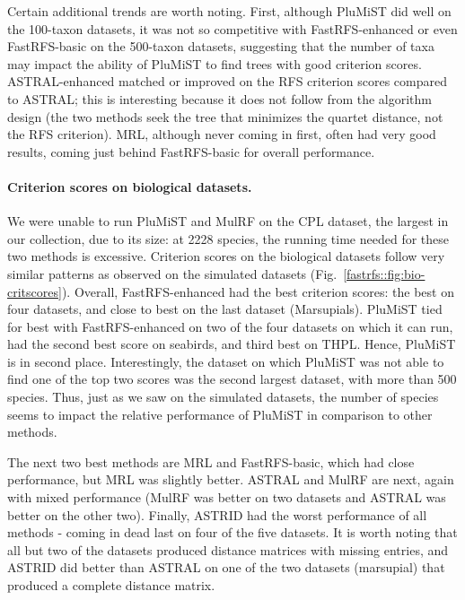 Certain additional trends are worth noting.
First, although PluMiST did well on the 100-taxon
datasets, it was not so competitive with FastRFS-enhanced
or even FastRFS-basic on the 500-taxon datasets, suggesting
that 
the number of taxa may impact the ability of
PluMiST to find trees with good criterion scores.
ASTRAL-enhanced matched or improved on the
RFS criterion scores compared
to ASTRAL; this is interesting because it
does not follow from the algorithm design
(the two methods seek the tree that minimizes
the quartet distance, not the RFS criterion).
MRL, although never coming in first, often
had very good results, coming just behind
FastRFS-basic for overall performance. 








\paragraph{Criterion scores on biological datasets. }

We were unable to 
run PluMiST and MulRF on the CPL dataset, the largest
in our collection, due to its size: at 2228 species,
the running time needed for these two methods is
excessive.
Criterion scores on the biological datasets follow 
very similar patterns as observed on the simulated 
datasets (Fig.~\ref{fastrfs::fig:bio-critscores}). %
Overall, FastRFS-enhanced had the
best criterion scores: the best on
four datasets, and close to best on the last
dataset (Marsupials).
PluMiST tied for best with FastRFS-enhanced
on two  of the four
datasets on which it can run, 
had the second best score on seabirds,
and third best on THPL.
Hence, PluMiST is in second place.
Interestingly, the dataset on which PluMiST was
not able to find one of the top two scores
was the second largest dataset, with more
than 500 species.
Thus, just as we 
saw on the simulated datasets, the number of species seems to impact
the relative performance of PluMiST in comparison
to other methods.

The next two best methods are MRL and FastRFS-basic,
which had close performance, but MRL was
slightly better.
ASTRAL and MulRF are next, again with
mixed performance (MulRF was better
on two datasets and ASTRAL was better on the other
two). Finally, ASTRID had the worst
performance of all methods - coming in 
dead last on four of the five datasets.
It is worth noting that all but two of
the datasets produced distance matrices
with missing entries, and ASTRID did better
than ASTRAL on one 
of the two datasets (marsupial)
that produced a complete distance matrix.









